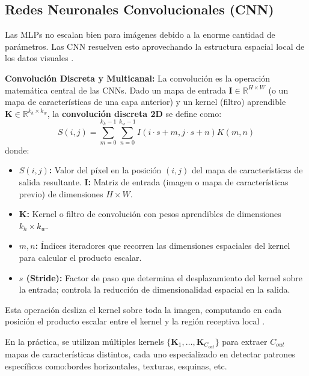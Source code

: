 \documentclass{article}
\begin{document}
\subsection{Redes Neuronales Convolucionales (CNN)}
Las MLPs no escalan bien para imágenes debido a la enorme cantidad de parámetros. Las CNN resuelven esto aprovechando la estructura espacial local de los datos visuales \cite{14}.

\textbf{Convolución Discreta y Multicanal: }
La convolución es la operación matemática central de las CNNs. Dado un mapa de entrada $\mathbf{I} \in \mathbb{R}^{H \times W}$ (o un mapa de características de una capa anterior) y un kernel (filtro) aprendible $\mathbf{K} \in \mathbb{R}^{k_h \times k_w}$, la \textbf{convolución discreta 2D} se define como:
\begin{equation}
    S(i, j) = \sum_{m=0}^{k_h-1} \sum_{n=0}^{k_w-1} I(i \cdot s + m, j \cdot s + n) K(m, n)
\end{equation}
donde:
\begin{itemize}
    \item \textbf{$S(i, j)$:} Valor del píxel en la posición $(i, j)$ del mapa de características de salida resultante.
    \textbf{$\mathbf{I}$:} Matriz de entrada (imagen o mapa de características previo) de dimensiones $H \times W$.
    
    \item \textbf{$\mathbf{K}$:} Kernel o filtro de convolución con pesos aprendibles de dimensiones $k_h \times k_w$.
    
    \item \textbf{$m, n$:} Índices iteradores que recorren las dimensiones espaciales del kernel para calcular el producto escalar.
    
    \item \textbf{$s$ (Stride):} Factor de paso que determina el desplazamiento del kernel sobre la entrada; controla la reducción de dimensionalidad espacial en la salida.
\end{itemize}

Esta operación desliza el kernel sobre toda la imagen, computando en cada posición el producto escalar entre el kernel y la región receptiva local \cite{14}.

En la práctica, se utilizan múltiples kernels $\{\mathbf{K}_1, \ldots, \mathbf{K}_{C_{out}}\}$ para extraer $C_{out}$ mapas de características distintos, cada uno especializado en detectar patrones específicos como:bordes horizontales, texturas, esquinas, etc. 
\end{document}
